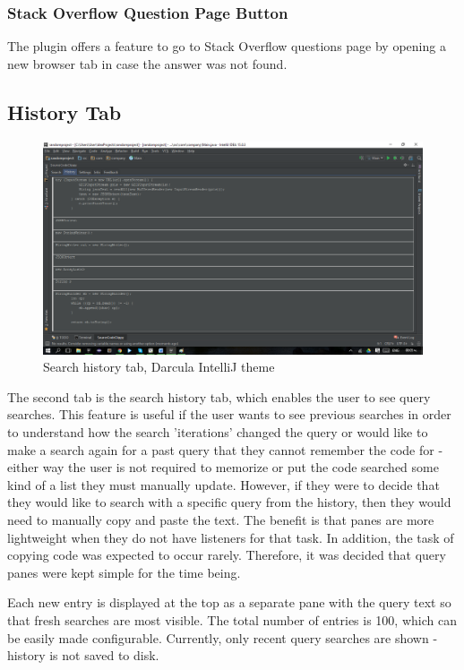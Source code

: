\documentclass{l4proj}
\begin{document}
\subsubsection{Stack Overflow Question Page Button}
The plugin offers a feature to go to Stack Overflow questions page by opening a new browser tab in case the answer was not found.


\subsection{History Tab}

\begin{figure}[H]
\includegraphics[scale=0.5]{tab-history}
\centering
\caption{Search history tab, Darcula IntelliJ theme}
\label{fig:history-tab}
\end{figure}

The second tab is the search history tab, which enables the user to see query searches. This feature is useful if the user wants to see previous searches in order to understand how the search 'iterations' changed the query or would like to make a search again for a past query that they cannot remember the code for - either way the user is not required to memorize or put the code searched some kind of a list they must manually update. However, if they were to decide that they would like to search with a specific query from the history, then they would need to manually copy and paste the text. The benefit is that panes are more lightweight when they do not have listeners for that task. In addition, the task of copying code was expected to occur rarely. Therefore, it was decided that query panes were kept simple for the time being.

\noindent
Each new entry is displayed at the top as a separate pane with the query text so that fresh searches are most visible. The total number of entries is 100, which can be easily made configurable. Currently, only recent query searches are shown - history is not saved to disk.
\end{document}
